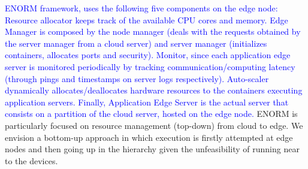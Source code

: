 \textcolor{blue}{  ENORM framework, uses the following five components on the edge node:
	Resource allocator keeps track of the available CPU cores and memory. Edge Manager is composed by the node manager (deals with the requests obtained by the server manager from a cloud server) and server manager (initializes containers, allocates ports and security). Monitor, since each application edge server is monitored periodically by tracking communication/computing latency (through pings and timestamps on server logs respectively). Auto-scaler dynamically allocates/deallocates hardware resources to the containers executing application servers. Finally, Application Edge Server is the actual server that consists on a partition of the cloud server, hosted on the edge node. } ENORM is particularly focused on resource management (top-down) from cloud to edge. We envision a bottom-up approach in which execution is firstly attempted at edge nodes and then going up in the hierarchy given the unfeasibility of running near to the devices.


